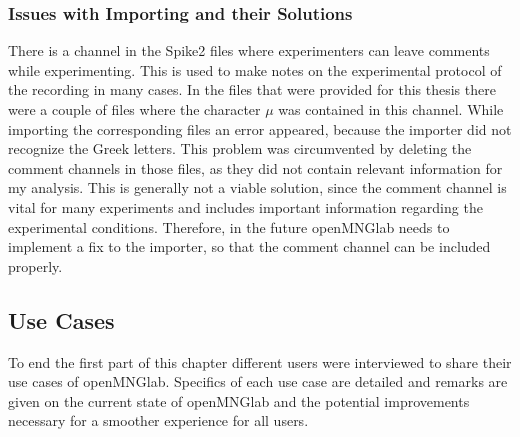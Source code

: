 \subsubsection{Issues with Importing and their Solutions}
There is a channel in the Spike2 files where experimenters can leave comments while experimenting. This is used to make notes on the experimental protocol of the recording in many cases. In the files that were provided for this thesis there were a couple of files where the character $\mu$ was contained in this channel. While importing the corresponding files an error appeared, because the importer did not recognize the Greek letters. This problem was circumvented by deleting the comment channels in those files, as they did not contain relevant information for my analysis. This is generally not a viable solution, since the comment channel is vital for many experiments and includes important information regarding the experimental conditions. Therefore, in the future openMNGlab needs to implement a fix to the importer, so that the comment channel can be included properly.

\subsection{Use Cases}
To end the first part of this chapter different users were interviewed to share their use cases of openMNGlab. Specifics of each use case are detailed and remarks are given on the current state of openMNGlab and the potential improvements necessary for a smoother experience for all users.

